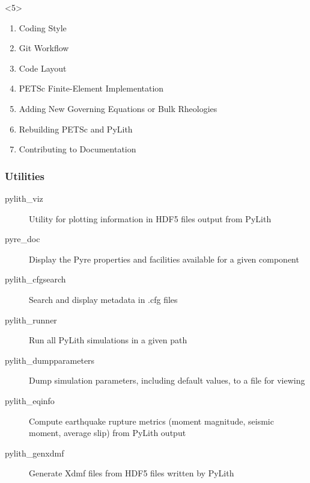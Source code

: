 \documentclass[aspectratio=169]{beamer}
\begin{document}
\begin{frame}[t]
\begin{itemize}
\begin{onlyenv}
\begin{itemize}
      \end{itemize}
    \end{onlyenv}
    \begin{onlyenv}<5>
      \begin{enumerate}
      \item Coding Style
      \item Git Workflow
      \item Code Layout
      \item PETSc Finite-Element Implementation
      \item Adding New Governing Equations or Bulk Rheologies
      \item Rebuilding PETSc and PyLith
      \item Contributing to Documentation
      \end{enumerate}
    \end{onlyenv}
  \end{itemize}

\end{frame}


\begin{frame}
  \frametitle{Utilities}

  \begin{description}
    \item[pylith\_viz] Utility for plotting information in HDF5 files output from PyLith
  \item[pyre\_doc] Display the Pyre properties and facilities available for a given component
  \item[pylith\_cfgsearch] Search and display metadata in .cfg files
  \item[pylith\_runner] Run all PyLith simulations in a given path
  \item[pylith\_dumpparameters] Dump simulation parameters, including default values, to a file for viewing
  \item[pylith\_eqinfo] Compute earthquake rupture metrics (moment magnitude, seismic moment, average slip) from PyLith output
  \item[pylith\_genxdmf] Generate Xdmf files from HDF5 files written by PyLith
  \end{description}  
  
\end{frame}
\end{document}
